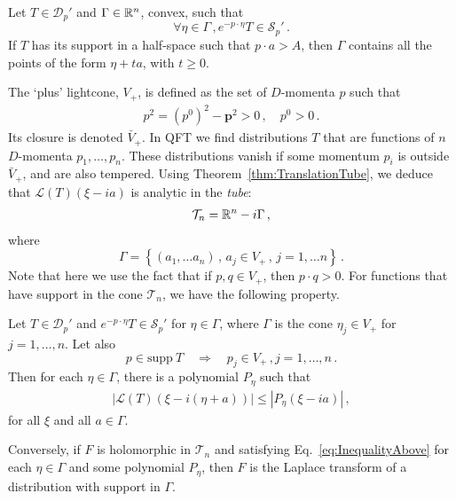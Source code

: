\begin{Thm}
    \label{thm:TranslationTube}
    Let $T\in\mathcal{D}_p'$ and $\Gamma\in\mathbb{R}^n$, convex, such that 
    \[
        \forall\eta\in\Gamma\, , e^{-p\cdot\eta} T \in \mathcal{S}_p'\, .    
    \]
    If $T$ has its support in a half-space such that $p\cdot a > A$, then
    $\Gamma$ contains all the points of the form $\eta + t a$, with $t\geq 0$.
\end{Thm}

The `plus' lightcone, $V_+$, is defined as the set of $D$-momenta $p$ such that
\begin{align}
    \label{eq:PlusLightConeDef}
    p^2 = (p^0)^2 - \mathbf{p}^2 > 0\, , \quad p^0 > 0\, .
\end{align}
Its closure is denoted $\bar{V}_+$. In QFT we find distributions $T$ that are
functions of $n$ $D$-momenta $p_1,\dots, p_n$. These distributions vanish if
some momentum $p_i$ is outside $\bar{V}_+$, and are also tempered. Using
Theorem~\ref{thm:TranslationTube}, we deduce that $\mathcal{L}(T)(\xi-ia)$ is
analytic in the {\em tube}:
\begin{align}
    \label{eq:ForwardTube}
    \mathcal{T}_n=\mathbb{R}^n - i\Gamma\, ,
\end{align}
where
\[
    \Gamma = \left\{
        (a_1, \ldots a_n)\, , \, a_j \in V_+\, , \, j=1, \ldots n
    \right\}\, .    
\]
Note that here we use the fact that if $p,q \in V_+$, then $p\cdot q > 0$. 
For functions that have support in the cone $\mathcal{T}_n$, we have the 
following property. 

\begin{Thm}
    Let $T \in \mathcal{D}_p'$ and $e^{-p\cdot\eta} T \in\mathcal{S}_p'$ 
    for $\eta\in\Gamma$, where $\Gamma$ is the cone $\eta_j\in V_+$ for 
    $j=1, \ldots, n$. Let also 
    \begin{equation}
        p \in \mathrm{supp}\ T 
        \quad \Longrightarrow \quad
        p_j \in V_+\, , j=1, \ldots, n\, .    
    \end{equation}
    Then for each $\eta\in\Gamma$, there is a polynomial $P_\eta$ 
    such that
    \begin{align}
        \label{eq:InequalityAbove}
        |\mathcal{L}(T)\left(\xi - i (\eta+a)\right)|
        \leq |P_\eta(\xi-ia)|\, ,
    \end{align}
    for all $\xi$ and all $a\in\Gamma$.

    Conversely, if $F$ is holomorphic in $\mathcal{T}_n$ and 
    satisfying Eq.~\eqref{eq:InequalityAbove} for each 
    $\eta\in\Gamma$ and some polynomial $P_\eta$, then $F$ is the 
    Laplace transform of a distribution with support in $\Gamma$.
\end{Thm}

